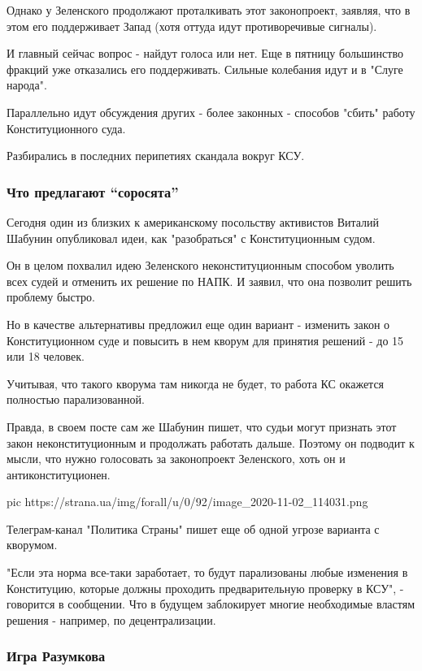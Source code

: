 Однако у Зеленского продолжают проталкивать этот законопроект, заявляя, что в
этом его поддерживает Запад (хотя оттуда идут противоречивые сигналы). 

И главный сейчас вопрос - найдут голоса или нет. Еще в пятницу большинство
фракций уже отказались его поддерживать. Сильные колебания идут и в "Слуге
народа". 

Параллельно идут обсуждения других - более законных - способов "сбить" работу
Конституционного суда.

Разбирались в последних перипетиях скандала вокруг КСУ. 

\subsubsection{Что предлагают ``соросята''}

Сегодня один из близких к американскому посольству активистов Виталий Шабунин
опубликовал идеи, как "разобраться" с Конституционным судом. 

Он в целом похвалил идею Зеленского неконституционным способом уволить всех
судей и отменить их решение по НАПК. И заявил, что она позволит решить проблему
быстро.

Но в качестве альтернативы предложил еще один вариант - изменить закон о
Конституционном суде и повысить в нем кворум для принятия решений - до 15 или
18 человек. 

Учитывая, что такого кворума там никогда не будет, то работа КС окажется
полностью парализованной. 

Правда, в своем посте сам же Шабунин пишет, что судьи могут признать этот закон
неконституционным и продолжать работать дальше. Поэтому он подводит к мысли,
что нужно голосовать за законопроект Зеленского, хоть он и антиконституционен.

\ifcmt
pic https://strana.ua/img/forall/u/0/92/image_2020-11-02_114031.png
\fi

Телеграм-канал "Политика Страны" пишет еще об одной угрозе варианта с кворумом.

"Если эта норма все-таки заработает, то будут парализованы любые изменения в
Конституцию, которые должны проходить предварительную проверку в КСУ", -
говорится в сообщении. Что в будущем заблокирует многие необходимые властям
решения - например, по децентрализации. 

\subsubsection{Игра Разумкова}

